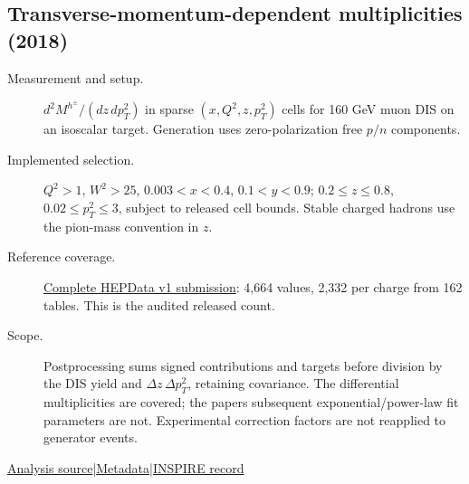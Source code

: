 \documentclass[11pt,a4paper]{article}
\newcommand{\id}[1]{{\small\texttt{\detokenize{#1}}}}
\begin{document}
\subsection{\texorpdfstring{Transverse-momentum-dependent multiplicities (2018)}{Transverse-momentum-dependent multiplicities (2018)}}
\id{COMPASS_2018_I1624692}\quad\cite{r1624692}
\begin{description}
\item[Measurement and setup.] $d^2M^{h^\pm}/(dz\,dp_T^2)$ in sparse $(x,Q^2,z,p_T^2)$ cells for 160 GeV muon DIS on an isoscalar target. Generation uses zero-polarization free $p/n$ components.
\item[Implemented selection.] $Q^2>1$, $W^2>25$, $0.003<x<0.4$, $0.1<y<0.9$; $0.2\le z\le0.8$, $0.02\le p_T^2\le3$, subject to released cell bounds. Stable charged hadrons use the pion-mass convention in $z$.
\item[Reference coverage.] \href{https://www.hepdata.net/record/ins1624692?version=1}{Complete HEPData v1 submission}: 4,664 values, 2,332 per charge from 162 tables. This is the audited released count.
\item[Scope.] Postprocessing sums signed contributions and targets before division by the DIS yield and $\Delta z\,\Delta p_T^2$, retaining covariance. The differential multiplicities are covered; the paper\textquotesingle s subsequent exponential/power-law fit parameters are not. Experimental correction factors are not reapplied to generator events.
\end{description}
{\small\href{https://github.com/apapaefs/HerwigPolarizedPheno/blob/105045bd757aaa6b217e87811dc5f9a22a8d1cef/analyses/rivet/dis/COMPASS_2018_I1624692.cc}{Analysis source}\quad|\quad\href{https://github.com/apapaefs/HerwigPolarizedPheno/blob/105045bd757aaa6b217e87811dc5f9a22a8d1cef/analyses/rivet/dis/COMPASS_2018_I1624692.info}{Metadata}\quad|\quad\href{https://inspirehep.net/literature/1624692}{INSPIRE record}}

\clearpage
{}
\end{document}
